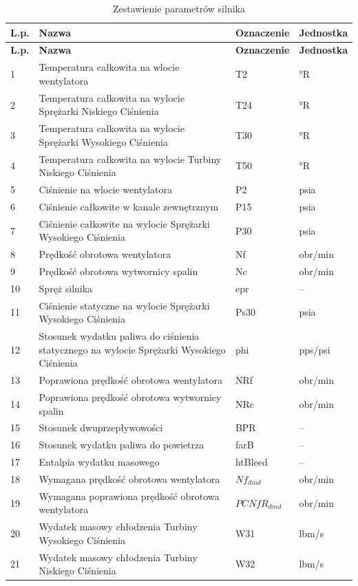 \begin{center}
\begin{longtable}{|p{1cm}||p{7cm}|p{2.2cm}|p{2cm}|}
\caption{Zestawienie parametrów silnika}
\label{tab:parametry_silnika} \\
\hline
\textbf{L.p.} & \textbf{Nazwa} & \textbf{Oznaczenie} & \textbf{Jednostka} \\
\hline
\endfirsthead

\hline
\textbf{L.p.} & \textbf{Nazwa} & \textbf{Oznaczenie} & \textbf{Jednostka} \\
\hline
\endhead

1  & Temperatura całkowita na wlocie wentylatora & T2   & °R \\
2  & Temperatura całkowita na wylocie Sprężarki Niskiego Ciśnienia & T24  & °R \\
3  & Temperatura całkowita na wylocie Sprężarki Wysokiego Ciśnienia & T30  & °R \\
4  & Temperatura całkowita na wylocie Turbiny Niskiego Ciśnienia & T50  & °R \\
5  & Ciśnienie na wlocie wentylatora & P2   & psia \\
6  & Ciśnienie całkowite w kanale zewnętrznym & P15  & psia \\
7  & Ciśnienie całkowite na wylocie Sprężarki Wysokiego Ciśnienia & P30  & psia \\
8  & Prędkość obrotowa wentylatora & Nf   & obr/min \\
9  & Prędkość obrotowa wytwornicy spalin & Nc   & obr/min \\
10 & Spręż silnika & epr  & -- \\
11 & Ciśnienie statyczne na wylocie Sprężarki Wysokiego Ciśnienia & Ps30 & psia \\
12 & Stosunek wydatku paliwa do ciśnienia statycznego na wylocie Sprężarki Wysokiego Ciśnienia & phi & pps/psi \\
13 & Poprawiona prędkość obrotowa wentylatora & NRf  & obr/min \\
14 & Poprawiona prędkość obrotowa wytwornicy spalin & NRc  & obr/min \\
15 & Stosunek dwuprzepływowości & BPR  & -- \\
16 & Stosunek wydatku paliwa do powietrza & farB & -- \\
17 & Entalpia wydatku masowego & htBleed & -- \\
18 & Wymagana prędkość obrotowa wentylatora & $Nf_{dmd}$ & obr/min \\
19 & Wymagana poprawiona prędkość obrotowa wentylatora & $PCNfR_{dmd}$ & obr/min \\
20 & Wydatek masowy chłodzenia Turbiny Wysokiego Ciśnienia & W31  & lbm/s \\
21 & Wydatek masowy chłodzenia Turbiny Niskiego Ciśnienia & W32  & lbm/s \\
\hline
\end{longtable}
\end{center}

